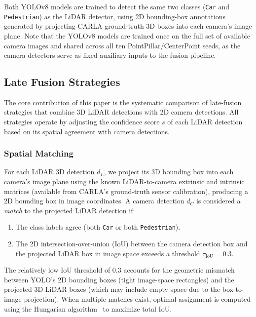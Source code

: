 \documentclass[sustainability,article,submit,moreauthors,pdftex]{Definitions/mdpi}
\begin{document}
Both YOLOv8 models are trained to detect the same two classes (\texttt{Car} and \texttt{Pedestrian}) as the LiDAR detector, using 2D bounding-box annotations generated by projecting CARLA ground-truth 3D boxes into each camera's image plane. Note that the YOLOv8 models are trained once on the full set of available camera images and shared across all ten PointPillar/CenterPoint seeds, as the camera detectors serve as fixed auxiliary inputs to the fusion pipeline.

\subsection{Late Fusion Strategies}\label{sec:fusion}

The core contribution of this paper is the systematic comparison of late-fusion strategies that combine 3D LiDAR detections with 2D camera detections. All strategies operate by adjusting the confidence score $s$ of each LiDAR detection based on its spatial agreement with camera detections.

\subsubsection{Spatial Matching}

For each LiDAR 3D detection $d_L$, we project its 3D bounding box into each camera's image plane using the known LiDAR-to-camera extrinsic and intrinsic matrices (available from CARLA's ground-truth sensor calibration), producing a 2D bounding box in image coordinates. A camera detection $d_C$ is considered a \emph{match} to the projected LiDAR detection if:

\begin{enumerate}[leftmargin=*,labelsep=4.9mm]
\item The class labels agree (both \texttt{Car} or both \texttt{Pedestrian}).
\item The 2D intersection-over-union (IoU) between the camera detection box and the projected LiDAR box in image space exceeds a threshold $\tau_{\mathrm{IoU}} = 0.3$.
\end{enumerate}

The relatively low IoU threshold of 0.3 accounts for the geometric mismatch between YOLO's 2D bounding boxes (tight image-space rectangles) and the projected 3D LiDAR boxes (which may include empty space due to the box-to-image projection). When multiple matches exist, optimal assignment is computed using the Hungarian algorithm~\cite{kuhn1955hungarian} to maximize total IoU.
\end{document}
